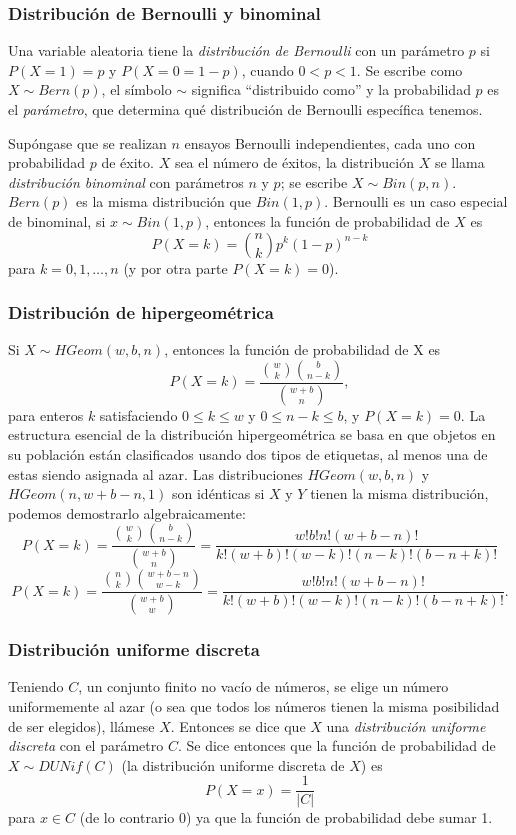 \documentclass[letterpaper]{article}
\begin{document}
\subsubsection {Distribución de Bernoulli y binominal}
Una variable aleatoria tiene la \emph{distribución de Bernoulli} con un parámetro $p$ si $P(X=1)=p$ y $P(X=0=1-p)$, cuando $0<p<1$. Se escribe como $X \sim Bern(p)$, el símbolo $\sim$ significa ``distribuido como'' y la probabilidad $p$ es el \emph{parámetro}, que determina qué distribución de Bernoulli específica tenemos.

Supóngase que se realizan $n$ ensayos Bernoulli independientes, cada uno con probabilidad $p$ de éxito. $X$ sea el número de éxitos, la distribución $X$ se llama \emph{distribución binominal} con parámetros $n$ y $p$; se escribe $X \sim Bin(p,n)$.
$Bern(p)$ es la misma distribución que $Bin(1,p)$. Bernoulli es un caso especial de binominal, si $x \sim Bin(1,p)$, entonces la función de probabilidad de $X$ es
\begin{equation}
P(X=k)=\binom{n}{k}p^k(1-p)^{n-k}
\end{equation}
para $k=0,1,\ldots,n$ (y por otra parte $P(X=k)=0$). 
\subsubsection {Distribución de hipergeométrica}
Si $X \sim HGeom(w,b,n)$, entonces la función de probabilidad de X es
\begin{equation}
P(X=k)=\frac{\binom{w}{k}\binom{b}{n-k}}{\binom{w+b}{n}},
\end{equation}
para enteros $k$ satisfaciendo $0\leq k\leq w$ y $0\leq n-k\leq b$, y $P(X=k)=0$. La estructura esencial de la distribución hipergeométrica se basa en que objetos en su población están clasificados usando dos tipos de etiquetas, al menos una de estas siendo asignada al azar.
Las distribuciones $HGeom(w,b,n)$ y $HGeom(n,w+b-n,1)$ son idénticas si $X$ y $Y$ tienen la misma distribución, podemos demostrarlo algebraicamente:
\begin{equation}
P(X=k)=\frac{\binom{w}{k}\binom{b}{n-k}}{\binom{w+b}{n}}=\frac{w!b!n!(w+b-n)!}{k!(w+b)!(w-k)!(n-k)!(b-n+k)!}
\end{equation}
\begin{equation}
P(X=k)=\frac{\binom{n}{k}\binom{w+b-n}{w-k}}{\binom{w+b}{w}}=\frac{w!b!n!(w+b-n)!}{k!(w+b)!(w-k)!(n-k)!(b-n+k)!}.
\end{equation}%
\subsubsection {Distribución uniforme discreta}
Teniendo $C$, un conjunto finito no vacío de números, se elige un número uniformemente al azar (o sea que todos los números tienen la misma posibilidad de ser elegidos), llámese $X$. Entonces se dice que $X$ una \emph{distribución uniforme discreta} con el parámetro $C$. Se dice entonces que la función de probabilidad de $X \sim DUNif(C)$ (la distribución uniforme discreta de $X$) es
\begin{equation}
P(X=x)=\frac{1}{|C|}
\end{equation}
para $x \in C$ (de lo contrario $0$) ya que la función de probabilidad debe sumar 1.
\end{document}
